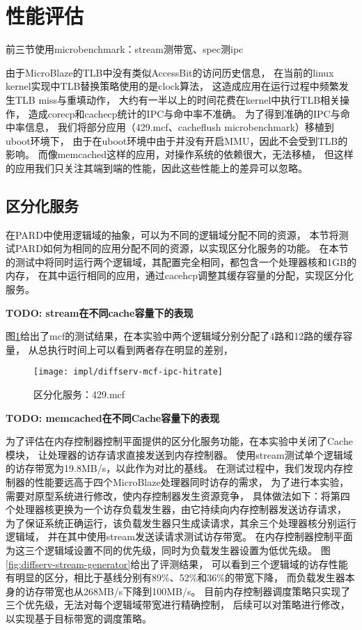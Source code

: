 \section{性能评估}

前三节使用microbenchmark：stream测带宽、spec测ipc

由于MicroBlaze的TLB中没有类似AccessBit的访问历史信息，
在当前的linux kernel实现中TLB替换策略使用的是clock算法，
这造成应用在运行过程中频繁发生TLB miss与重填动作，
大约有一半以上的时间花费在kernel中执行TLB相关操作，
造成corecp和cachecp统计的IPC与命中率不准确。
为了得到准确的IPC与命中率信息，
我们将部分应用（429.mcf、cacheflush microbenchmark）移植到uboot环境下，
由于在uboot环境中由于并没有开启MMU，因此不会受到TLB的影响。
而像memcached这样的应用，对操作系统的依赖很大，无法移植，
但这样的应用我们只关注其端到端的性能，因此这些性能上的差异可以忽略。


\subsection{区分化服务}

在PARD中使用逻辑域的抽象，可以为不同的逻辑域分配不同的资源，
本节将测试PARD如何为相同的应用分配不同的资源，以实现区分化服务的功能。
在本节的测试中将同时运行两个逻辑域，其配置完全相同，都包含一个处理器核和1GB的内存，
在其中运行相同的应用，通过cacehcp调整其缓存容量的分配，实现区分化服务。

\textbf{TODO: stream在不同cache容量下的表现}


图\ref{fig:diffserv-mcf-ipc-hitrate}给出了mcf的测试结果，在本实验中两个逻辑域分别分配了4路和12路的缓存容量，
从总执行时间上可以看到两者存在明显的差别，

\begin{figure}[tb]
  \centering
  \texttt{[image: impl/diffserv-mcf-ipc-hitrate]}
  \caption{区分化服务：429.mcf}
  \label{fig:diffserv-mcf-ipc-hitrate}
\end{figure}


\textbf{TODO: memcached在不同Cache容量下的表现}

为了评估在内存控制器控制平面提供的区分化服务功能，在本实验中关闭了Cache模块，
让处理器的访存请求直接发送到内存控制器。
使用stream测试单个逻辑域的访存带宽为19.8MB/s，以此作为对比的基线。
在测试过程中，我们发现内存控制器的性能要远高于四个MicroBlaze处理器同时访存的需求，
为了进行本实验，需要对原型系统进行修改，使内存控制器发生资源竞争，
具体做法如下：将第四个处理器核更换为一个访存负载发生器，由它持续向内存控制器发送访存请求，
为了保证系统正确运行，该负载发生器只生成读请求，其余三个处理器核分别运行逻辑域，
并在其中使用stream发送读请求测试访存带宽。
在内存控制器控制平面为这三个逻辑域设置不同的优先级，同时为负载发生器设置为低优先级。
图\ref{fig:diffserv-stream-generator}给出了评测结果，
可以看到三个逻辑域的访存性能有明显的区分，相比于基线分别有89\%、52\%和36\%的带宽下降，
而负载发生器本身的访存带宽也从268MB/s下降到100MB/s。
目前内存控制器调度策略只实现了三个优先级，无法对每个逻辑域带宽进行精确控制，
后续可以对策略进行修改，以实现基于目标带宽的调度策略。

